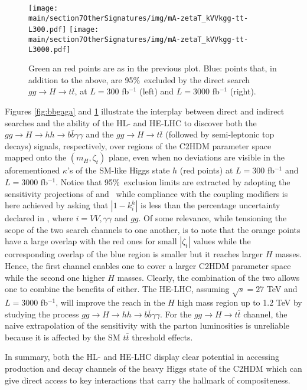\begin{figure}
\centering
{\texttt{[image: \\main/section7OtherSignatures/img/mA-zetaT\_kVVkgg-tt-L300.pdf]}} \quad
{\texttt{[image: \\main/section7OtherSignatures/img/mA-zetaT\_kVVkgg-tt-L3000.pdf]}}
\caption{Green an red points are as in the previous plot.
Blue: points that, in addition to the above,  are  95\%~\cl excluded by  the direct search $gg\to H\to t\bar t$, at $L=300$ fb$^{-1}$ (left) and $L=3000$ fb$^{-1}$ (right).
\label{fig:tt}}
\end{figure}
Figures \ref{fig:bbgaga} and \ref{fig:tt}  illustrate the interplay between direct and indirect searches and
the ability of the HL- and HE-LHC  to discover both the $gg\to H\to hh\to b\bar b\gamma\gamma$ and the $gg \to H\to t\bar t$ (followed by semi-leptonic top decays) signals, respectively, over regions of the C2HDM parameter space mapped onto the $(m_H,\zeta_t)$ plane, even when no deviations are visible in the aforementioned $\kappa$'s of the SM-like Higgs state $h$ (red points) at $L=300$ fb$^{-1}$ and $L=3000$ fb$^{-1}$. 
Notice that 95\%~\cl exclusion limits are extracted by  adopting the sensitivity projections of  and~\cite{CMS:2017ihs} while compliance with the coupling modifiers is here achieved by asking that $|1 - k^h_i|$ is less than the percentage uncertainty declared in , where $i=VV,\gamma\gamma$ and $gg$. Of some relevance, while tensioning the scope of the two search channels to one another, is to note that the orange  points have a large overlap with the red ones for small $| \zeta_t| $ values while 
the corresponding overlap of the blue region is smaller but it reaches larger $H$ masses. Hence, the first channel enables one to cover a larger C2HDM parameter space while the second one higher $H$ masses. Clearly, the combination of the two allows one to combine the benefits of either.  The  HE-LHC,  assuming $\sqrt s=27$ TeV and $ L=3000$ fb$^{-1}$,  will improve the reach in the $H$ high mass region up to 1.2 TeV by studying the process $gg\to H\to hh\to b\bar b\gamma\gamma$. For the $gg \to H\to t\bar t$  channel,  the naive extrapolation of the sensitivity with the parton luminosities is unreliable because it is affected by the SM $t \bar t$ threshold effects.

In summary, both the HL- and HE-LHC display clear potential in accessing production and decay channels of the heavy \cpeven Higgs state of the C2HDM which can give direct access to key interactions that carry the hallmark of 
compositeness.
